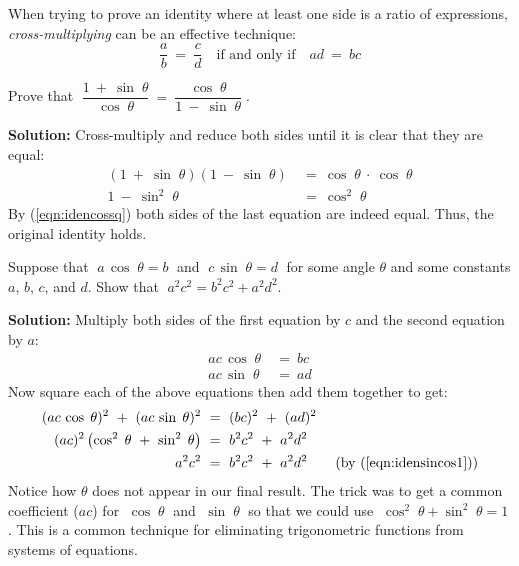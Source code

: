 When trying to prove an identity where at least one side is a ratio of expressions,
\emph{cross-multiplying} can be an effective technique:
\begin{displaymath}
 \frac{a}{b} ~=~ \frac{c}{d} \quad\text{if and only if}\quad ad ~=~ bc
\end{displaymath}

\begin{exmp}
 Prove that $\;\dfrac{1 ~+~ \sin\;\theta}{\cos\;\theta} ~=~ \dfrac{\cos\;\theta}{1 ~-~
 \sin\;\theta}\;$.\vspace{2mm}
 \par\noindent\textbf{Solution:} Cross-multiply and reduce both sides until it is clear that they are
 equal:
 \begin{align*}
  ( 1 ~+~ \sin\;\theta ) ( 1 ~-~ \sin\;\theta ) ~ &= ~ \cos\;\theta ~\cdot~ \cos\;\theta\\
  1 ~-~ \sin^2 \;\theta ~ &= ~ \cos^2 \;\theta
 \end{align*}
 By (\ref{eqn:idencossq}) both sides of the last equation are indeed equal. Thus, the original
 identity holds.
\end{exmp}
\begin{exmp}\label{exmp:elimtheta}
 Suppose that $\;a\,\cos\;\theta = b\;$ and $\;c\,\sin\;\theta = d\;$ for some angle $\theta$ and
 some constants $a$, $b$, $c$, and $d$. Show that $\;a^2 c^2 = b^2 c^2 + a^2 d^2$.\vspace{1mm}
 \par\noindent\textbf{Solution:} Multiply both sides of the first equation by $c$ and the second
 equation by $a$:
 \begin{align*}
  ac\,\cos\;\theta ~ &= ~ bc\\
  ac\,\sin\;\theta ~ &= ~ ad
 \end{align*}
 Now square each of the above equations then add them together to get:
 \begin{align*}
  (ac\,\cos\;\theta)^2 ~+~ (ac\,\sin\;\theta)^2 ~ &= ~ (bc)^2 ~+~ (ad)^2\\
  (ac)^2 \left( \cos^2 \;\theta ~+~ \sin^2 \;\theta \right)~ &= ~ b^2 c^2 ~+~ a^2 d^2\\
  a^2 c^2 ~ &= ~ b^2 c^2 ~+~ a^2 d^2 \qquad\text{(by (\ref{eqn:idensincos1}))}
 \end{align*}
 Notice how $\theta$ does not appear in our final result. The trick was to get a common coefficient
 ($ac$) for $\;\cos\;\theta\;$ and $\;\sin\;\theta\;$ so that we could use
 $\;\cos^2 \;\theta + \sin^2 \;\theta = 1$. This is a common technique for eliminating trigonometric
 functions from systems of equations.
\end{exmp}\vspace{-2mm}
